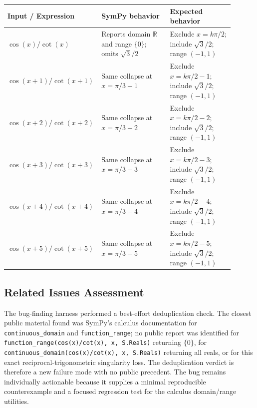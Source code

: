 \documentclass[11pt]{article}
\begin{document}
\begin{center}
\renewcommand{\arraystretch}{1.3}
\begin{tabular}{@{}>{\raggedright\arraybackslash}p{0.32\linewidth}>{\raggedright\arraybackslash}p{0.30\linewidth}>{\raggedright\arraybackslash}p{0.28\linewidth}@{}}
\toprule
\textbf{Input / Expression} & \textbf{SymPy behavior} & \textbf{Expected behavior} \\
\midrule
\( \cos(x)/\cot(x) \) & Reports domain \(\mathbb{R}\) and range \(\{0\}\); omits \(\sqrt{3}/2\) & Exclude \(x=k\pi/2\); include \(\sqrt{3}/2\); range \((-1,1)\) \\
\( \cos(x+1)/\cot(x+1) \) & Same collapse at \(x=\pi/3-1\) & Exclude \(x=k\pi/2-1\); include \(\sqrt{3}/2\); range \((-1,1)\) \\
\( \cos(x+2)/\cot(x+2) \) & Same collapse at \(x=\pi/3-2\) & Exclude \(x=k\pi/2-2\); include \(\sqrt{3}/2\); range \((-1,1)\) \\
\( \cos(x+3)/\cot(x+3) \) & Same collapse at \(x=\pi/3-3\) & Exclude \(x=k\pi/2-3\); include \(\sqrt{3}/2\); range \((-1,1)\) \\
\( \cos(x+4)/\cot(x+4) \) & Same collapse at \(x=\pi/3-4\) & Exclude \(x=k\pi/2-4\); include \(\sqrt{3}/2\); range \((-1,1)\) \\
\( \cos(x+5)/\cot(x+5) \) & Same collapse at \(x=\pi/3-5\) & Exclude \(x=k\pi/2-5\); include \(\sqrt{3}/2\); range \((-1,1)\) \\
\bottomrule
\end{tabular}
\end{center}

\subsection{Related Issues Assessment}

The bug-finding harness performed a best-effort deduplication check. The closest public material found was SymPy's calculus documentation for \texttt{continuous\_domain} and \texttt{function\_range}; no public report was identified for \texttt{function\_range(cos(x)/cot(x), x, S.Reals)} returning \(\{0\}\), for \texttt{continuous\_domain(cos(x)/cot(x), x, S.Reals)} returning all reals, or for this exact reciprocal-trigonometric singularity loss. The deduplication verdict is therefore a new failure mode with no public precedent. The bug remains individually actionable because it supplies a minimal reproducible counterexample and a focused regression test for the calculus domain/range utilities.
\end{document}
